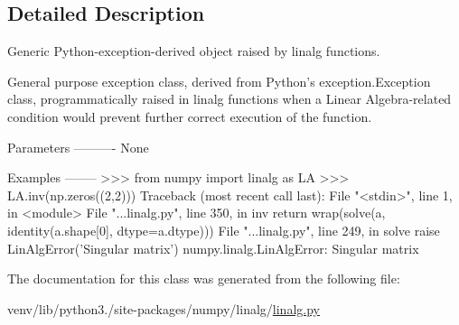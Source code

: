 \subsection{Detailed Description}
\begin{DoxyVerb}Generic Python-exception-derived object raised by linalg functions.

General purpose exception class, derived from Python's exception.Exception
class, programmatically raised in linalg functions when a Linear
Algebra-related condition would prevent further correct execution of the
function.

Parameters
----------
None

Examples
--------
>>> from numpy import linalg as LA
>>> LA.inv(np.zeros((2,2)))
Traceback (most recent call last):
  File "<stdin>", line 1, in <module>
  File "...linalg.py", line 350,
    in inv return wrap(solve(a, identity(a.shape[0], dtype=a.dtype)))
  File "...linalg.py", line 249,
    in solve
    raise LinAlgError('Singular matrix')
numpy.linalg.LinAlgError: Singular matrix\end{DoxyVerb}
 

The documentation for this class was generated from the following file\+:\begin{DoxyCompactItemize}
\item 
venv/lib/python3./site-\/packages/numpy/linalg/\hyperlink{linalg_8py}{linalg.\+py}\end{DoxyCompactItemize}
